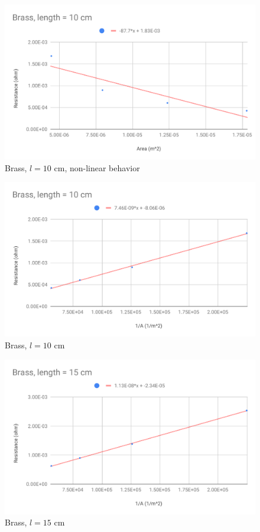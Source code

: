 \begin{figure}[ht]
	\centering
	\includegraphics[scale=0.74]{image/02-resistance/10cm-non-linear.pdf}
	\caption{Brass, $l = 10$ cm, non-linear behavior}
	\label{figure.02.10cm.non.linear}
\end{figure}
\begin{figure}[ht]
	\centering
	\includegraphics[scale=0.74]{image/02-resistance/10cm.pdf}
	\caption{Brass, $l = 10$ cm}
	\label{figure.02.10cm}
\end{figure}
\begin{figure}[ht]
	\centering
	\includegraphics[scale=0.74]{image/02-resistance/15cm.pdf}
	\caption{Brass, $l = 15$ cm}
	\label{figure.02.15cm}
\end{figure}
